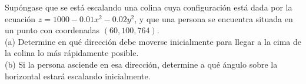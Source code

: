 \item Supóngase que se está escalando una colina cuya configuración está dada por la ecuación $z = 1000 - 0.01x^2 - 0.02y^2$, y que una persona se encuentra situada en un punto con coordenadas $(60, 100, 764)$. \\
(a) Determine en qué dirección debe moverse inicialmente para llegar a la cima de la colina lo más rápidamente posible. \\
(b) Si la persona asciende en esa dirección, determine a qué ángulo sobre la horizontal estará escalando inicialmente.
